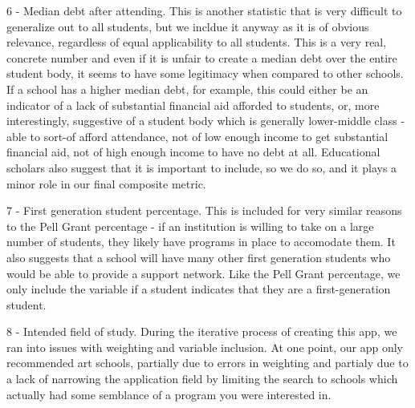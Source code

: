 \documentclass{article}
\begin{document}
6 - Median debt after attending. This is another statistic that is very difficult to generalize out to all students, but we incldue it anyway as it is of obvious relevance, regardless of equal applicability to all students. This is a very real, concrete number and even if it is unfair to create a median debt over the entire student body, it seems to have some legitimacy when compared to other schools. If a school has a higher median debt, for example, this could either be an indicator of a lack of substantial financial aid afforded to students, or, more interestingly, suggestive of a student body which is generally lower-middle class - able to sort-of afford attendance, not of low enough income to get substantial financial aid, not of high enough income to have no debt at all. Educational scholars also suggest that it is important to include, so we do so, and it plays a minor role in our final composite metric.

7 - First generation student percentage. This is included for very similar reasons to the Pell Grant percentage - if an institution is willing to take on a large number of students, they likely have programs in place to accomodate them. It also suggests that a school will have many other first generation students who would be able to provide a support network. Like the Pell Grant percentage, we only include the variable if a student indicates that they are a first-generation student. 

8 - Intended field of study. During the iterative process of creating this app, we ran into issues with weighting and variable inclusion. At one point, our app only recommended art schools, partially due to errors in weighting and partialy due to a lack of narrowing the application field by limiting the search to schools which actually had some semblance of a program you were interested in. 
\end{document}
